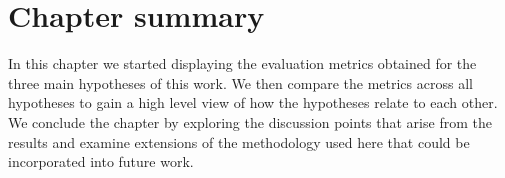 \section{Chapter summary}

In this chapter we started displaying the evaluation metrics obtained for the
three main hypotheses of this work. We then compare the metrics across all
hypotheses to gain a high level view of how the hypotheses relate to each other.
We conclude the chapter by exploring the discussion points that arise from the
results and examine extensions of the methodology used here that could be
incorporated into future work.
